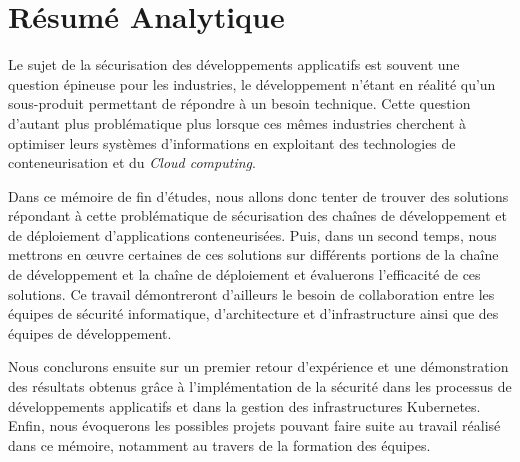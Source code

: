 \chapter*{Résumé Analytique}
Le sujet de la sécurisation des développements applicatifs est souvent une question épineuse pour les industries, le 
développement n'étant en réalité qu'un sous-produit permettant de répondre à un besoin technique.
\newline Cette question d'autant plus problématique plus lorsque ces mêmes industries cherchent à optimiser leurs systèmes d'informations 
en exploitant des technologies de conteneurisation et du \emph{Cloud computing}.

Dans ce mémoire de fin d'études, nous allons donc tenter de trouver des solutions répondant à cette problématique de 
sécurisation des chaînes de développement et de déploiement d'applications conteneurisées. Puis, dans un second temps, 
nous mettrons  en œuvre certaines de ces solutions sur différents portions de la chaîne de développement et la chaîne 
de déploiement et évaluerons l'efficacité de ces solutions.
\newline Ce travail démontreront d'ailleurs le besoin de collaboration entre les équipes de sécurité informatique,
d'architecture et d'infrastructure ainsi que des équipes de développement.

Nous conclurons ensuite sur un premier retour d'expérience et une démonstration des résultats obtenus grâce à 
l'implémentation de la sécurité dans les processus de développements applicatifs et dans la gestion des infrastructures
Kubernetes.
Enfin, nous évoquerons les possibles projets pouvant faire suite au travail réalisé dans ce mémoire, notamment au travers
de la formation des équipes.
